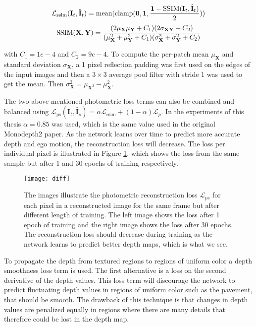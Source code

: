 \begin{equation}
\mathcal{L}_{\mathrm{ssim}}(\textbf{I}_t, \hat{\textbf{I}}_t)=\operatorname{mean}(\operatorname{clamp}(\textbf{0},\textbf{1},\dfrac{\textbf{1}-\operatorname{SSIM}(\textbf{I}_t, \hat{\textbf{I}}_t)}{2}))
\end{equation}
\begin{equation}
\operatorname{SSIM}(\textbf{X},\textbf{Y})=\frac{(2\mu_{\textbf{X}}\mu_{\textbf{Y}}+C_1)(2\sigma_{\textbf{XY}}+C_2)}{(\mu_{\textbf{X}}^2+\mu_{\textbf{Y}}^2+C_1)(\sigma_{\textbf{X}}^2+\sigma_{\textbf{Y}}^2+C_2)}
\end{equation}

with $C_1=1e-4$ and $C_2=9e-4$. To compute the per-patch mean $\mu_{\textbf{X}}$ and standard deviation $\sigma_{\textbf{X}}$, a 1 pixel reflection padding was first used on the edges of the input images and then a $3\times3$ average pool filter with stride 1 was used to get the mean. Then $ \sigma^2_{\textbf{X}}=\mu_{\textbf{X}^2}-\mu_{\textbf{X}}^2 $.

The two above mentioned photometric loss terms can also be combined and balanced using $ \mathcal{L}_{\mathrm{ps}}(\textbf{I}_t, \hat{\textbf{I}}_s) = \alpha \mathcal{L}_{\mathrm{ssim}} + (1-\alpha) \mathcal{L}_p $. In the experiments of this thesis $\alpha=0.85$ was used, which is the same value used in the original Monodepth2 paper. As the network learns over time to predict more accurate depth and ego motion, the reconstruction loss will decrease. The loss per individual pixel is illustrated in Figure \ref{fig:diff}, which shows the loss from the same sample but after 1 and 30 epochs of training respectively.

\begin{figure}[H]
	\centering
	\texttt{[image: diff]}
	\caption{The images illustrate the photometric reconstruction loss $ \mathcal{L}_{ps} $ for each pixel in a reconstructed image for the same frame but after different length of training. The left image shows the loss after 1 epoch of training and the right image shows the loss after 30 epochs. The reconstruction loss should decrease during training as the network learns to predict better depth maps, which is what we see.}
	\label{fig:diff}
\end{figure}

To propagate the depth from textured regions to regions of uniform color a depth smoothness loss term is used. The first alternative is a loss on the second derivative of the depth values. This loss term will discourage the network to predict fluctuating depth values in regions of uniform color such as the pavement, that should be smooth. The drawback of this technique is that changes in depth values are penalized equally in regions where there are many details that therefore could be lost in the depth map.

